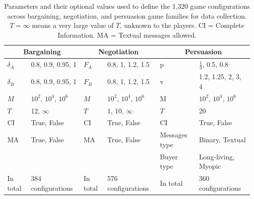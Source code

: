 \begin{table}[t]
\centering
\caption{Parameters and their optional values used to define the 1,320 game configurations across bargaining, negotiation, and persuasion game families for data collection.
$T=\infty$ means a very large value of $T$, unknown to the players.
CI = Complete Information.
MA = Textual messages allowed.
}
\begin{tabular}{ll|ll|ll}
\toprule
\multicolumn{2}{c|}{\textbf{Bargaining}} & \multicolumn{2}{c|}{\textbf{Negotiation}} & \multicolumn{2}{c}{\textbf{Persuasion}} \\
\midrule
$\delta_A$       & 0.8, 0.9, 0.95, 1           & $F_A$          & 0.8, 1, 1.2, 1.5               & p                   & $\frac{1}{3}$, 0.5, 0.8 \\
$\delta_B$       & 0.8, 0.9, 0.95, 1           & $F_B$          & 0.8, 1, 1.2, 1.5               & v                   & 1.2, 1.25, 2, 3, 4      \\
$M$              & $10^2$, $10^4$, $10^6$      & $M$            & $10^2$, $10^4$, $10^6$         & M       & $10^2$, $10^4$, $10^6$  \\
$T$              & 12, $\infty$                & $T$            & 1, 10, $\infty$                & $T$    & 20  \\
CI               & True, False                 & CI             & True, False                    & CI & True, False             \\
MA               & True, False                 & MA             & True, False                    &      Messages type & Binary, Textual   \\
                 &                             &                &                                &            Buyer type     & Long-living, Myopic \\
\midrule
                 In total & 384 configurations                            &                In total & 576 configurations                                &            In total & 360 configurations \\
\bottomrule
\end{tabular}
\label{tab:configurations}
\end{table}
